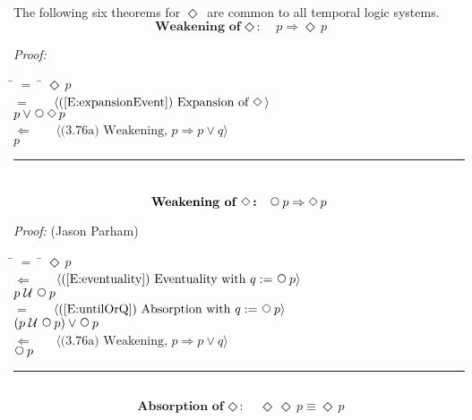 \documentclass[fleqn, leqno]{article}
\newcommand{\lgap}{2pt}                             %
\newcommand{\mymathindent}{24pt}                    %
\newcommand{\impl}{\ensuremath{\Rightarrow}}        %
\newcommand{\foll}{\ensuremath{\Leftarrow}}         %
\newcommand{\Until}{\;\mathcal{U}\;}
\newcommand{\Next}{\;\,\text{\raisebox{3.5pt}{\circle{6}}}}
\newcommand{\Event}{\Diamond\,}
\newcommand{\myqed}{\hfill\rule[-.23ex]{1.2ex}{2.0ex}}
\newcommand{\Gll} {\langle}                         %
\newcommand{\Ggg} {\rangle}                         %
\newcommand{\Hint}[1]     {\ \ \ $\Gll              \mbox{#1} \Ggg$ }   %
\begin{document}

The following six theorems for $\Event$ are common to all temporal logic systems.
\begin{equation}\label{E:impEvent}
\textbf{Weakening of $\Event$:}\quad p \impl \Event p
\end{equation}

\emph{Proof:}
\begin{tabbing}
\hspace{\mymathindent} \= $= \;$ \= \kill
  \> \>   $\Event p$\\[\lgap]
  \> $=$  \>  \Hint{(\ref{E:expansionEvent}) Expansion of $\Event$}\\[\lgap]
  \> \>   $p \lor \Next\Event p$\\[\lgap]
  \> $\foll$  \>  \Hint{(3.76a) Weakening, $p\impl p\lor q$}\\[\lgap]
  \> \>   $p$
\end{tabbing}
\myqed\\[\lgap]


\begin{equation}\label{E:nextEvent}
\textbf{Weakening of $\Event$:}\quad \Next p \impl \Event p
\end{equation}

\emph{Proof:} (Jason Parham)
\begin{tabbing}
\hspace{\mymathindent} \= $= \;$ \= \kill
  \> \>   $\Event p$\\[\lgap]
  \> $\foll$  \>  \Hint{(\ref{E:eventuality}) Eventuality with $q := \Next p$}\\[\lgap]
  \> \>   $p \Until \Next p$\\[\lgap]
  \> $=$  \>  \Hint{(\ref{E:untilOrQ}) Absorption with $q := \Next p$}\\[\lgap]
  \> \>   $(p \Until \Next p) \lor \Next p$\\[\lgap]
  \> $\foll$  \>  \Hint{(3.76a) Weakening, $p\impl p\lor q$}\\[\lgap]
  \> \>   $\Next p$
\end{tabbing}
\myqed\\[\lgap]


\begin{equation}\label{E:IdemEvent}
\textbf{Absorption of $\Event$:}\quad \Event\Event p \equiv \Event p
\end{equation}
\end{document}

